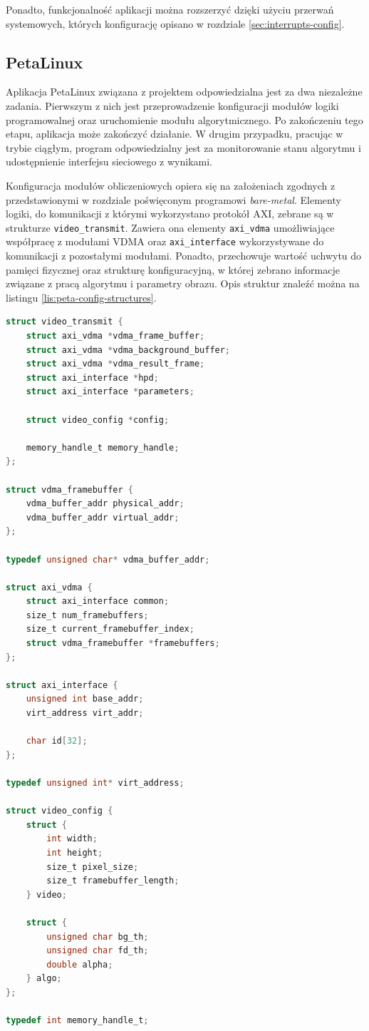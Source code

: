 Ponadto, funkcjonalność aplikacji można rozszerzyć dzięki użyciu przerwań systemowych, których konfigurację opisano w rozdziale \ref{sec:interrupts-config}.

\subsection{PetaLinux}

Aplikacja PetaLinux związana z projektem odpowiedzialna jest za dwa niezależne zadania. 
Pierwszym z nich jest przeprowadzenie konfiguracji modułów logiki programowalnej oraz uruchomienie modułu algorytmicznego. 
Po zakończeniu tego etapu, aplikacja może zakończyć działanie.
W drugim przypadku, pracując w trybie ciągłym, program odpowiedzialny jest za monitorowanie stanu algorytmu i udostępnienie interfejsu sieciowego z wynikami.

Konfiguracja modułów obliczeniowych opiera się na założeniach zgodnych z przedstawionymi w rozdziale poświęconym programowi \emph{bare-metal}.
Elementy logiki, do komunikacji z którymi wykorzystano protokół AXI, zebrane są w strukturze \texttt{video\_transmit}. 
Zawiera ona elementy \texttt{axi\_vdma} umożliwiające współpracę z modułami VDMA oraz \texttt{axi\_interface} wykorzystywane do komunikacji z pozostałymi modułami. 
Ponadto, przechowuje wartość uchwytu do pamięci fizycznej oraz strukturę konfiguracyjną, w której zebrano informacje związane z pracą algorytmu i parametry obrazu. 
Opis struktur znaleźć można na listingu \ref{lis:peta-config-structures}.

\begin{lstlisting}[breaklines,language=C, label=lis:peta-config-structures, caption=Struktury konfiguracyjne aplikacji.]
struct video_transmit {
	struct axi_vdma *vdma_frame_buffer;
	struct axi_vdma *vdma_background_buffer;
	struct axi_vdma *vdma_result_frame;
	struct axi_interface *hpd;
	struct axi_interface *parameters;
	
	struct video_config *config;
	
	memory_handle_t memory_handle;
};

struct vdma_framebuffer {
	vdma_buffer_addr physical_addr;
	vdma_buffer_addr virtual_addr;
};

typedef unsigned char* vdma_buffer_addr;

struct axi_vdma {
	struct axi_interface common;
	size_t num_framebuffers;
	size_t current_framebuffer_index;
	struct vdma_framebuffer *framebuffers;
};

struct axi_interface {
	unsigned int base_addr;
	virt_address virt_addr;
	
	char id[32];
};

typedef unsigned int* virt_address;

struct video_config {
	struct {
		int width;
		int height;
		size_t pixel_size;
		size_t framebuffer_length;
	} video;

	struct {
		unsigned char bg_th;
		unsigned char fd_th;
		double alpha;
	} algo;
};

typedef int memory_handle_t;

\end{lstlisting}


